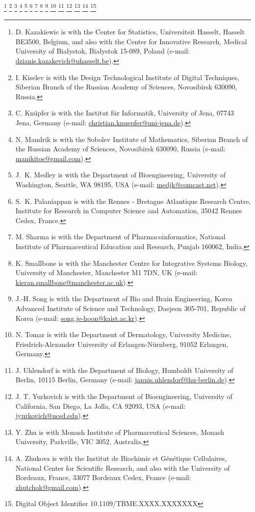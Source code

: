 \documentclass[journal,transmag]{IEEEtran}
\newcommand{\email}[1]{\href{mailto:#1}{#1}}
\begin{document}
{    \thanks{D. Kazakiewic is with the Center for Statistics, Universiteit Hasselt, Hasselt BE3500, Belgium, and also with the Center for Innovative Research, Medical University of Białystok, Białystok 15-089, Poland (e-mail: \email{dzianis.kazakevich@uhasselt.be}).}
    \thanks{I. Kiselev is with the Design Technological Institute of Digital Techniques, Siberian Branch of the Russian Academy of Sciences, Novosibirsk 630090, Russia.}
    \thanks{C. Kn\"{u}pfer is with the Institut f\"ur Informatik, University of Jena, 07743 Jena, Germany (e-mail: \email{christian.knuepfer@uni-jena.de}).}
    \thanks{N. Mandrik is with the Sobolev Institute of Mathematics, Siberian Branch of the Russian Academy of Sciences, Novosibirsk 630090, Russia (e-mail: \email{manikitos@gmail.com}).}
    \thanks{J.~K. Medley is with the Department of Bioengineering, University of Washington, Seattle, WA 98195, USA (e-mail: \email{medjk@comcast.net}).}
    \thanks{S.~K. Palaniappan is with the Rennes - Bretagne Atlantique Research Centre, Institute for Research in Computer Science and Automation, 35042 Rennes Cedex, France.}
    \thanks{M. Sharma is with the Department of Pharmacoinformatics, National Institute of Pharmaceutical Education and Research, Punjab 160062, India.}
    \thanks{K. Smallbone is with the Manchester Centre for Integrative Systems Biology, University of Manchester, Manchester M1 7DN, UK (e-mail: \email{kieran.smallbone@manchester.ac.uk}).}
    \thanks{J.-H. Song is with the Department of Bio and Brain Engineering, Korea Advanced Institute of Science and Technology, Daejeon 305-701, Republic of Korea (e-mail: \email{song.je-hoon@kaist.ac.kr}).}
    \thanks{N. Tomar is with the Department of Dermatology, University Medicine, Friedrich-Alexander University of Erlangen-N\"urnberg, 91052 Erlangen, Germany.}
    \thanks{J. Uhlendorf is with the Department of Biology, Humboldt University of Berlin, 10115 Berlin, Germany (e-mail: \email{jannis.uhlendorf@hu-berlin.de}).}
    \thanks{J. T. Yurkovich is with the Department of Bioengineering, University of California, San Diego, La Jolla, CA 92093, USA (e-mail: \email{jyurkovich@ucsd.edu}).}
    \thanks{Y. Zhu is with Monash Institute of Pharmaceutical Sciences, Monash University, Parkville, VIC 3052, Australia.}
    \thanks{A. Zhukova is with the Institut de Biochimie et Génétique Cellulaires, National Center for Scientific Research, and also with the University of Bordeaux, France, 33077 Bordeaux Cedex, France (e-mail: \email{zhutchok@gmail.com}).}
    \thanks{Digital Object Identifier 10.1109/TBME.XXXX.XXXXXXX}
}
\end{document}
